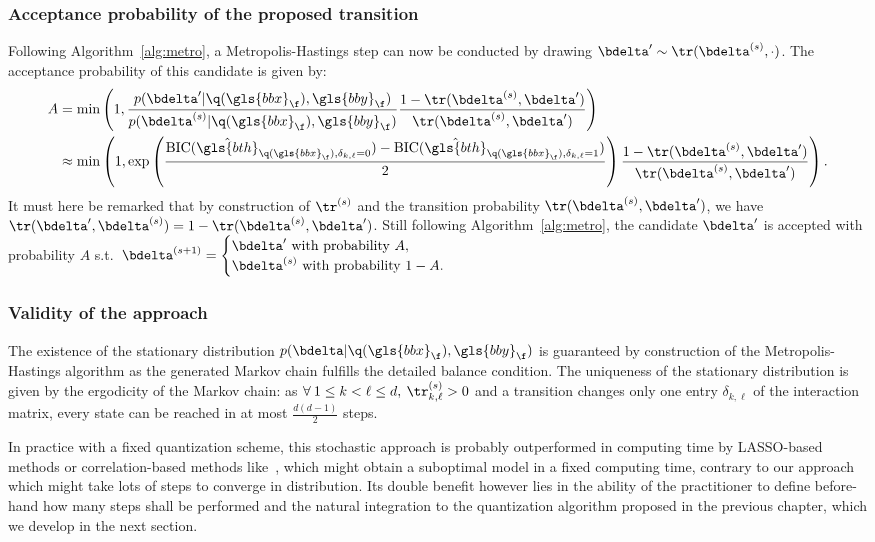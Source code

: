 \subsubsection{Acceptance probability of the proposed transition}


Following Algorithm~\eqref{alg:metro}, a Metropolis-Hastings step can now be conducted by drawing $\bdelta' \sim \tr(\bdelta^{(s)},\cdot)$. The acceptance probability of this candidate is given by:
\begin{align*}
A & = \min \left( 1, \frac{p(\bdelta' | \q(\gls{bbx}_\f), \gls{bby}_\f)}{p(\bdelta^{(s)} | \q(\gls{bbx}_\f), \gls{bby}_\f)} \frac{1-\tr(\bdelta^{(s)},\bdelta')}{\tr(\bdelta^{(s)},\bdelta')} \right) \\
& \approx \min \left( 1, \exp \left( \frac{\text{BIC}(\hat{\gls{bth}}_{\q(\gls{bbx}_\f),\delta_{k,\ell}=0}) - \text{BIC}(\hat{\gls{bth}}_{\q(\gls{bbx}_\f),\delta_{k,\ell}=1})}{2} \right) \frac{1-\tr(\bdelta^{(s)},\bdelta')}{\tr(\bdelta^{(s)},\bdelta')} \right).
\end{align*}
It must here be remarked that by construction of $\tr^{(s)}$ and the transition probability $\tr(\bdelta^{(s)},\bdelta')$, we have $\tr(\bdelta',\bdelta^{(s)}) = 1 - \tr(\bdelta^{(s)},\bdelta')$. Still following Algorithm~\eqref{alg:metro}, the candidate $\bdelta'$ is accepted with probability $A$ s.t.\ $\bdelta^{(s+1)} = \begin{cases} \bdelta' \text{ with probability } A, \\ \bdelta^{(s)} \text{ with probability } 1-A. \end{cases}$

\subsubsection{Validity of the approach}


The existence of the stationary distribution $p(\bdelta | \q(\gls{bbx}_\f),\gls{bby}_\f)$ is guaranteed by construction of the Metropolis-Hastings algorithm as the generated Markov chain fulfills the detailed balance condition. The uniqueness of the stationary distribution is given by the ergodicity of the Markov chain: as $\forall \: 1 \leq  k < \ell \leq d, \: \tr_{k,\ell}^{(s)} > 0$ and a transition changes only one entry $\delta_{k,\ell}$ of the interaction matrix, every state can be reached in at most $\frac{d(d-1)}{2}$ steps.

In practice with a fixed quantization scheme, this stochastic approach is probably outperformed in computing time by LASSO-based methods or correlation-based methods like~\cite{simon}, which might obtain a suboptimal model in a fixed computing time, contrary to our approach which might take lots of steps to converge in distribution. Its double benefit however lies in the ability of the practitioner to define before-hand how many steps shall be performed and the natural integration to the quantization algorithm proposed in the previous chapter, which we develop in the next section.

